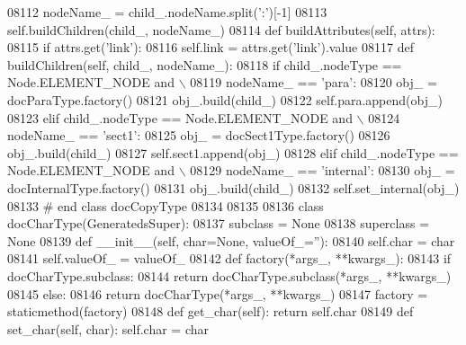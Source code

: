 \begin{DoxyCode}
{{{{{{{{{{{{{{{{{{{{{{{{{{{{{{{{{{{{{{{{{{{{{{{{{{{{{{{{{{{{{{{{{{{{{{{{{{{{{{{{{{{{{{{{{{{{{{{{{{{{{{{{{{{{{{{{{{{{{{{{{{{{{{{{{{{{{{{{{{{{{{{{{{{{{{{{{{{{{{{{{{{{{{{{{{{{{{{{{{{{{{{{{{{{{{{{{{{{{{{{{{{{{{{{{{{{{{{{{{{{{{{{{{{{{{{{{{{{{{{{{{{{{{{{{{{{{{{{{{{{{{{{{{{{{{{{{{{{{{{{{{{{{{{{{{{{{{{{{{{{{{{{{{{{{{{{{{{{{{{{{{{{{{{{{{{{{{{{{{{{{{{{{{{{{{{{{{{{{{{{{{{{{{{{{{{{{{{{{{{{{{{{{{{{{{{{{{{{{{{{{{{{{{{{{{{{{{{{{{{{{{{{{{{{{{{{{{{{{{{{{{{{{{{{{{{{{{{{{{{{{{{{{{{{{{{{{{{{{{{{{{{{{{{{{{{{{{{{08112             nodeName\_ = child\_.nodeName.split(\textcolor{stringliteral}{':'})[-1]
08113             self.buildChildren(child\_, nodeName\_)
08114     \textcolor{keyword}{def }buildAttributes(self, attrs):
08115         \textcolor{keywordflow}{if} attrs.get(\textcolor{stringliteral}{'link'}):
08116             self.link = attrs.get(\textcolor{stringliteral}{'link'}).value
08117     \textcolor{keyword}{def }buildChildren(self, child\_, nodeName\_):
08118         \textcolor{keywordflow}{if} child\_.nodeType == Node.ELEMENT\_NODE \textcolor{keywordflow}{and} \(\backslash\)
08119             nodeName\_ == \textcolor{stringliteral}{'para'}:
08120             obj\_ = docParaType.factory()
08121             obj\_.build(child\_)
08122             self.para.append(obj\_)
08123         \textcolor{keywordflow}{elif} child\_.nodeType == Node.ELEMENT\_NODE \textcolor{keywordflow}{and} \(\backslash\)
08124             nodeName\_ == \textcolor{stringliteral}{'sect1'}:
08125             obj\_ = docSect1Type.factory()
08126             obj\_.build(child\_)
08127             self.sect1.append(obj\_)
08128         \textcolor{keywordflow}{elif} child\_.nodeType == Node.ELEMENT\_NODE \textcolor{keywordflow}{and} \(\backslash\)
08129             nodeName\_ == \textcolor{stringliteral}{'internal'}:
08130             obj\_ = docInternalType.factory()
08131             obj\_.build(child\_)
08132             self.set_internal(obj\_)
08133 \textcolor{comment}{# end class docCopyType}
08134 
08135 
08136 \textcolor{keyword}{class }docCharType(GeneratedsSuper):
08137     subclass = \textcolor{keywordtype}{None}
08138     superclass = \textcolor{keywordtype}{None}
08139     \textcolor{keyword}{def }__init__(self, char=None, valueOf\_=''):
08140         self.char = char
08141         self.valueOf_ = valueOf\_
08142     \textcolor{keyword}{def }factory(*args\_, **kwargs\_):
08143         \textcolor{keywordflow}{if} docCharType.subclass:
08144             \textcolor{keywordflow}{return} docCharType.subclass(*args\_, **kwargs\_)
08145         \textcolor{keywordflow}{else}:
08146             \textcolor{keywordflow}{return} docCharType(*args\_, **kwargs\_)
08147     factory = staticmethod(factory)
08148     \textcolor{keyword}{def }get_char(self): \textcolor{keywordflow}{return} self.char
08149     \textcolor{keyword}{def }set_char(self, char): self.char = char
}}}}}}}}}}}}}}}}}}}}}}}}}}}}}}}}}}}}}}}}}}}}}}}}}}}}}}}}}}}}}}}}}}}}}}}}}}}}}}}}}}}}}}}}}}}}}}}}}}}}}}}}}}}}}}}}}}}}}}}}}}}}}}}}}}}}}}}}}}}}}}}}}}}}}}}}}}}}}}}}}}}}}}}}}}}}}}}}}}}}}}}}}}}}}}}}}}}}}}}}}}}}}}}}}}}}}}}}}}}}}}}}}}}}}}}}}}}}}}}}}}}}}}}}}}}}}}}}}}}}}}}}}}}}}}}}}}}}}}}}}}}}}}}}}}}}}}}}}}}}}}}}}}}}}}}}}}}}}}}}}}}}}}}}}}}}}}}}}}}}}}}}}}}}}}}}}}}}}}}}}}}}}}}}}}}}}}}}}}}}}}}}}}}}}}}}}}}}}}}}}}}}}}}}}}}}}}}}}}}}}}}}}}}}}}}}}}}}}}}}}}}}}}}}}}}}}}}}}}}}}}}}}}}}}}}}}}}}}}}}}}}}}}}}}}}}}}}}
\end{DoxyCode}
